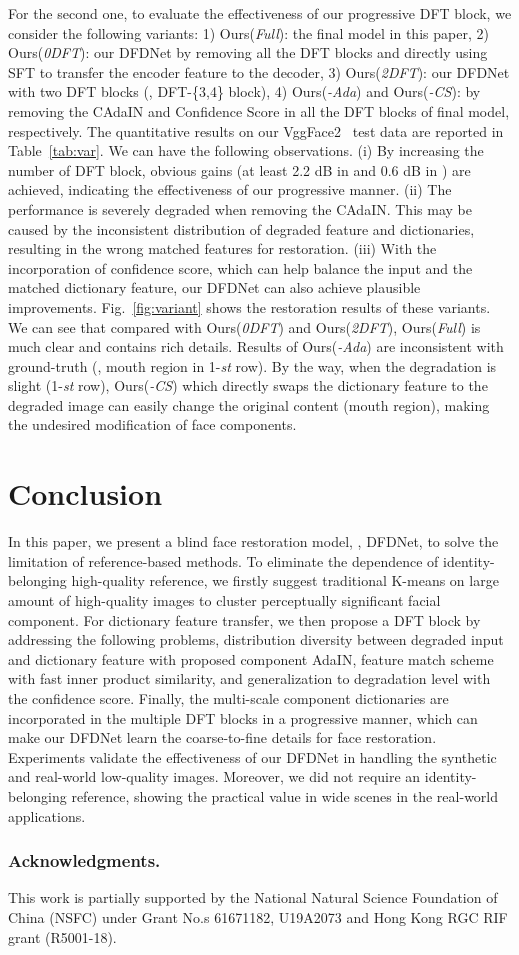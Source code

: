 \documentclass[runningheads]{llncs}
\begin{document}
For the second one, to evaluate the effectiveness of our progressive DFT block, we consider the following variants: 
1) Ours(\textit{Full}): the final model in this paper, 
2) Ours(\textit{0DFT}): our DFDNet by removing all the DFT blocks and directly using SFT to transfer the encoder feature to the decoder, 
3) Ours(\textit{2DFT}): our DFDNet with two DFT blocks (\ie, DFT-\{3,4\} block), 
4) Ours(\textit{-Ada}) and Ours(\textit{-CS}): by removing the CAdaIN and Confidence Score in all the DFT blocks of final model, respectively. The quantitative results on our VggFace2~\cite{cao2018vggface2} test data are reported in Table~\ref{tab:var}. We can have the following observations. (i) By increasing the number of DFT block, obvious gains (at least 2.2 dB in  and 0.6 dB in ) are achieved, indicating the effectiveness of our progressive manner. (ii) The performance is severely degraded when removing the CAdaIN. This may be caused by the inconsistent distribution of degraded feature and dictionaries, resulting in the wrong matched features for restoration. (iii) With the incorporation of confidence score, which can help balance the input and the matched dictionary feature, our DFDNet can also achieve plausible improvements. Fig.~\ref{fig:variant} shows the restoration results of these variants. We can see that compared with Ours(\textit{0DFT}) and Ours(\textit{2DFT}), Ours(\textit{Full}) is much clear and contains rich details. Results of Ours(\textit{-Ada}) are inconsistent with ground-truth (\ie, mouth region in 1-\textit{st} row). 
By the way, when the degradation is slight (1-\textit{st} row),  Ours(\textit{-CS}) which directly swaps the dictionary feature to the degraded image can easily change the original content (mouth region), making the undesired modification of face components.
\section{Conclusion}\label{section5}
In this paper, we present a blind face restoration model, \ie, DFDNet, to solve the limitation of reference-based methods. To eliminate the dependence of identity-belonging high-quality reference, we firstly suggest traditional K-means on large amount of high-quality images to cluster perceptually significant facial component. For dictionary feature transfer, we then propose a DFT block by addressing the following problems, distribution diversity between degraded input and dictionary feature with proposed component AdaIN, feature match scheme with fast inner product similarity, and generalization to degradation level with the confidence score. Finally, the multi-scale component dictionaries are incorporated in the multiple DFT blocks in a progressive manner, which can make our DFDNet learn the coarse-to-fine details for face restoration. Experiments validate the effectiveness of our DFDNet in handling the synthetic and real-world low-quality images. Moreover, we did not require an identity-belonging reference, showing the practical value in wide scenes in the real-world applications.

\subsubsection{Acknowledgments.}
This work is partially supported by the National Natural Science Foundation of China (NSFC) under Grant No.s 61671182, U19A2073 and Hong Kong RGC RIF grant (R5001-18).
\clearpage


\end{document}
